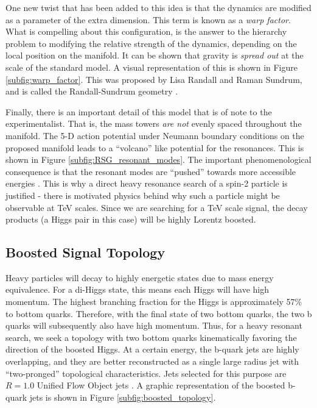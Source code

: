 \documentclass[12pt]{article}
\begin{document}
One new twist that has been added to this idea is that the dynamics are modified
as a parameter of the extra dimension. This term is known as a \textit{warp
factor}. What is compelling about this configuration, is the answer to the
hierarchy problem to modifying the relative strength of the dynamics, depending
on the local position on the manifold. It can be shown that gravity is
\textit{spread out} at the scale of the standard model. A visual
representation of this is shown in Figure \ref{subfig:warp_factor}. This was
proposed by Lisa Randall and Raman Sundrum, and is called the Randall-Sundrum
geometry \cite{RandallSundrumOriginal, bsm}.

Finally, there is an important detail of this model that is of note to the
experimentalist. That is, the mass towers \textit{are not} evenly spaced
throughout the manifold. The 5-D action potential under Neumann boundary
conditions on the proposed manifold leads to a ``volcano'' like potential for
the resonances. This is shown in Figure \ref{subfig:RSG_resonant_modes}. The
important phenomenological consequence is that the resonant modes are ``pushed''
towards more accessible energies \cite{RandallSundrumOriginal, bsm}. This is why
a direct heavy resonance search of a spin-2 particle is justified - there is
motivated physics behind why such a particle might be observable at TeV scales.
Since we are searching for a TeV scale signal, the decay products (a Higgs pair
in this case) will be highly Lorentz boosted.

\subsection{Boosted Signal Topology}
Heavy particles will decay to highly energetic states due to mass energy
equivalence. For a di-Higgs state, this means each Higgs will have high
momentum. The highest branching fraction for the Higgs is approximately 57\% to
bottom quarks. Therefore, with the final state of two bottom quarks, the two b
quarks will subsequently also have high momentum. Thus, for a heavy resonant
search, we seek a topology with two bottom quarks kinematically favoring the
direction of the boosted Higgs. At a certain energy, the b-quark jets are highly
overlapping, and they are better reconstructed as a single large radius jet with
``two-pronged'' topological characteristics. Jets selected for this purpose are
$R=1.0$ Unified Flow Object jets \cite{boosted_hbbcc_tagger, large_r_jet}. A
graphic representation of the boosted b-quark jets is shown in Figure
\ref{subfig:boosted_topology}. 
\end{document}
